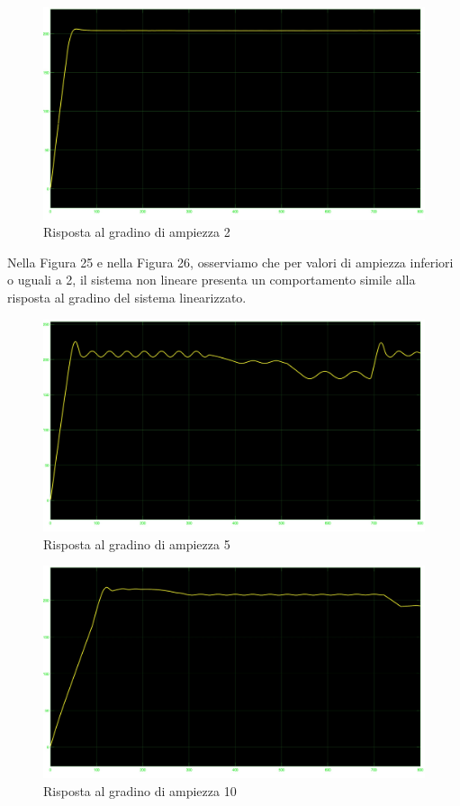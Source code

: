 \documentclass[a4paper, 11pt]{article}
\begin{document}
\begin{figure}[!h]
    \centering
    \includegraphics[scale=0.2]{Step_nonLineare/Step2_noLin.jpg}
    \caption{Risposta al gradino di ampiezza 2}
    \label{fig:enter-label}
\end{figure}

Nella Figura 25 e nella Figura 26, osserviamo che per valori di ampiezza inferiori o uguali a 2, il sistema non lineare presenta un comportamento simile alla risposta al gradino del sistema linearizzato.

\begin{figure}[!h]
    \centering
    \includegraphics[scale=0.2]{Step_nonLineare/Step5_noLin.jpg}
    \caption{Risposta al gradino di ampiezza 5}
    \label{fig:enter-label}
\end{figure}

\begin{figure}[!h]
    \centering
    \includegraphics[scale=0.2]{Step_nonLineare/Step10_noLin.jpg}
    \caption{Risposta al gradino di ampiezza 10}
    \label{fig:enter-label}
\end{figure}
\end{document}
